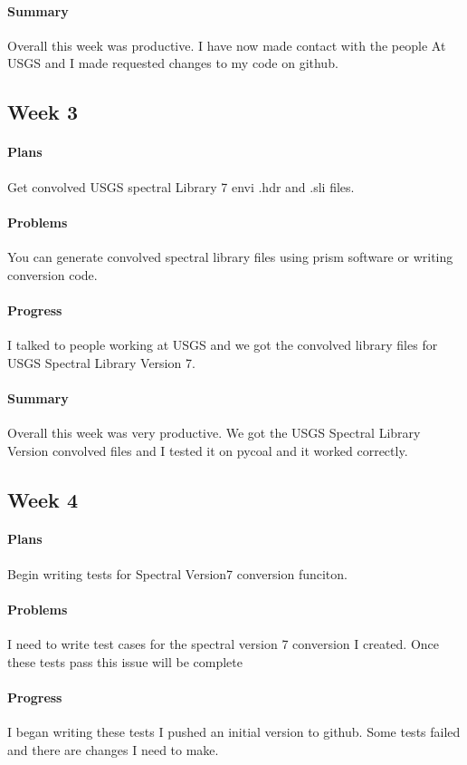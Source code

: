 \documentclass{article}
\begin{document}
\paragraph{Summary}
Overall this week was productive. I have now made contact with the people
At USGS and I made requested changes to my code on github. 
\subsection{Week 3}
\paragraph{Plans}
Get convolved USGS spectral Library 7 envi .hdr and .sli files. 
\paragraph{Problems}
 You can generate convolved spectral library files using prism software or writing conversion code. 
\paragraph{Progress}
I talked to people working at USGS and we got the convolved library files for USGS Spectral Library Version 7.
\paragraph{Summary}
Overall this week was very productive. We got the USGS Spectral Library 
Version convolved files and I tested it on pycoal and it worked correctly. 
\subsection{Week 4}
\paragraph{Plans}
Begin writing tests for Spectral Version7 conversion funciton. 
\paragraph{Problems}
I need to write test cases for the spectral version 7 conversion I created. Once these tests pass this issue will be complete
\paragraph{Progress}
I began writing these tests I pushed an initial version to github. Some tests failed and there are changes I need to make. 
\end{document}
